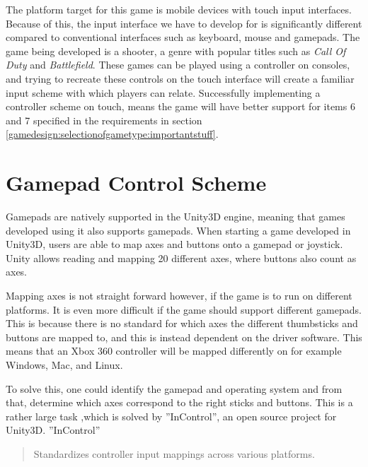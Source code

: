 The platform target for this game is mobile devices with touch input interfaces.
Because of this, the input interface we have to develop for is significantly different compared to conventional interfaces such as keyboard, mouse and gamepads.
The game being developed is a shooter, a genre with popular titles such as \textit{Call Of Duty}\cite{callofdutysales} and \textit{Battlefield}\cite{battlefieldsales}.
These games can be played using a controller on consoles, and trying to recreate these controls on the touch interface will create a familiar input scheme with which players can relate.
Successfully implementing a controller scheme on touch, means the game will have better support for items 6 and 7 specified in the requirements in section \ref{gamedesign:selectionofgametype:importantstuff}.

\section{Gamepad Control Scheme}
Gamepads are natively supported in the Unity3D engine, meaning that games developed using it also supports gamepads\cite{unity_manual_inputmanager}.
When starting a game developed in Unity3D, users are able to map axes and buttons onto a gamepad or joystick. Unity allows reading and mapping 20 different axes, where buttons also count as axes.

Mapping axes is not straight forward however, if the game is to run on different platforms.
It is even more difficult if the game should support different gamepads.
This is because there is no standard for which axes the different thumbsticks and buttons are mapped to, and this is instead dependent on the driver software.
This means that an Xbox 360 controller will be mapped differently on for example Windows, Mac, and Linux.
\cite{unity_wiki_xbox360controller}

To solve this, one could identify the gamepad and operating system and from that, determine which axes correspond to the right sticks and buttons. This is a rather large task ,which is solved by ''InControl'', an open source project for Unity3D\cite{incontrol_github}. ''InControl'' \begin{quote}Standardizes controller input mappings across various platforms.\cite{incontrol_website}\end{quote}

